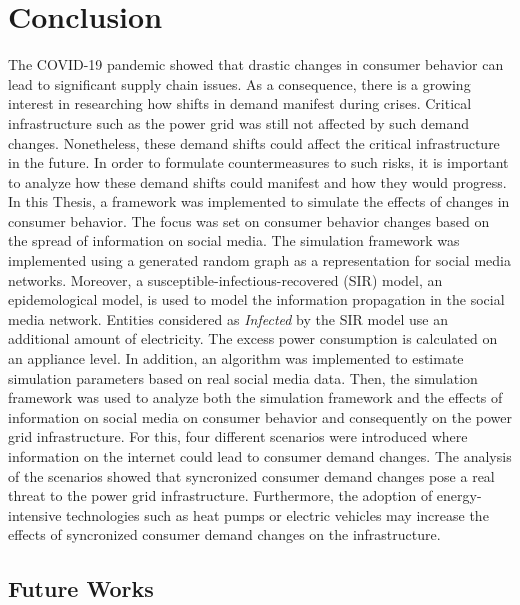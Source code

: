 \chapter{Conclusion}
\label{conclusion}

The COVID-19 pandemic showed that drastic changes in 
consumer behavior can lead to significant supply chain issues.
As a consequence, there is a growing interest in researching 
how shifts in demand manifest during crises. 
Critical infrastructure such as the power grid
was still not affected by such demand changes.
Nonetheless, these demand shifts could affect the critical 
infrastructure in the future. In order to 
formulate countermeasures to such risks, it is 
important to analyze how these demand shifts could 
manifest and how they would progress. In this Thesis,
a framework was implemented to simulate the effects of 
changes in consumer behavior. The focus was set on
consumer behavior changes based on the spread
of information on social media. 
The simulation framework was implemented using 
a generated random graph as a representation for social 
media networks. Moreover, a susceptible-infectious-recovered 
(SIR) model, an epidemological model, is used to model 
the information propagation in the social media network.
Entities considered as \textit{Infected}
by the SIR model use an additional amount of 
electricity. The excess power consumption is 
calculated on an appliance level.
In addition, an algorithm was implemented to estimate 
simulation parameters based on real social media 
data. Then, the simulation framework was
used to analyze both the simulation framework and
the effects of information 
on social media on consumer behavior and 
consequently on the power grid infrastructure.
For this, four different 
scenarios were introduced where information
on the internet could lead to consumer demand
changes. 
The analysis of the scenarios 
showed that syncronized consumer
demand changes pose a real threat to the power
grid infrastructure. Furthermore, the adoption
of energy-intensive technologies such as heat
pumps or electric vehicles may increase the 
effects of syncronized consumer demand changes
on the infrastructure.

\section{Future Works}


